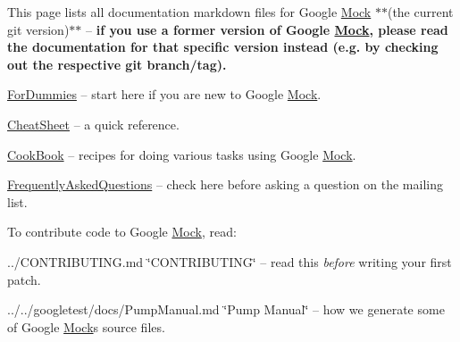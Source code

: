 This page lists all documentation markdown files for Google \mbox{\hyperlink{class_mock}{Mock}} $\ast$$\ast$(the current git version)$\ast$$\ast$ -- {\bfseries{if you use a former version of Google \mbox{\hyperlink{class_mock}{Mock}}, please read the documentation for that specific version instead (e.\+g. by checking out the respective git branch/tag).}}


\begin{DoxyItemize}
\item \mbox{\hyperlink{_obj__test_2lib_2googletest-release-1_88_81_2googlemock_2docs_2_for_dummies_8md}{For\+Dummies}} -- start here if you are new to Google \mbox{\hyperlink{class_mock}{Mock}}.
\item \mbox{\hyperlink{_obj__test_2lib_2googletest-release-1_88_81_2googlemock_2docs_2_cheat_sheet_8md}{Cheat\+Sheet}} -- a quick reference.
\item \mbox{\hyperlink{_obj__test_2lib_2googletest-release-1_88_81_2googlemock_2docs_2_cook_book_8md}{Cook\+Book}} -- recipes for doing various tasks using Google \mbox{\hyperlink{class_mock}{Mock}}.
\item \mbox{\hyperlink{_obj__test_2lib_2googletest-release-1_88_81_2googlemock_2docs_2_frequently_asked_questions_8md}{Frequently\+Asked\+Questions}} -- check here before asking a question on the mailing list.
\end{DoxyItemize}

To contribute code to Google \mbox{\hyperlink{class_mock}{Mock}}, read\+:


\begin{DoxyItemize}
\item ../\+C\+O\+N\+T\+R\+I\+B\+U\+T\+I\+NG.md \char`\"{}\+C\+O\+N\+T\+R\+I\+B\+U\+T\+I\+N\+G\char`\"{} -- read this {\itshape before} writing your first patch.
\item ../../googletest/docs/\+Pump\+Manual.md \char`\"{}\+Pump Manual\char`\"{} -- how we generate some of Google \mbox{\hyperlink{class_mock}{Mock}}\textquotesingle{}s source files. 
\end{DoxyItemize}